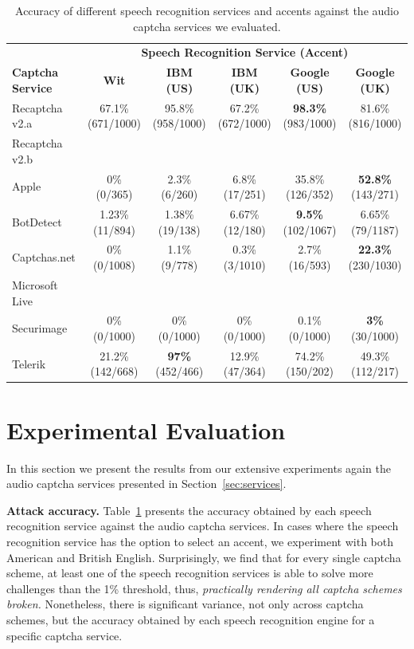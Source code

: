\begin{table}[t]
\centering
\caption{Accuracy of different speech recognition services and accents against the audio captcha services we evaluated.}
\begin{tabular}{lccccc}
\toprule
&\multicolumn{5}{c}{\textbf{Speech Recognition Service (Accent)}}\\
\cmidrule{2-6}
\textbf{Captcha Service}& \textbf{Wit}& \textbf{IBM (US)} & \textbf{ IBM (UK)} & \textbf{Google (US)} & \textbf{Google (UK)} \\
\hline
Recaptcha v2.a & 67.1\% (671/1000) & 95.8\% (958/1000) & 67.2\% (672/1000) & \textbf{98.3\%} (983/1000) & 81.6\% (816/1000) \\
\rowcolor{Gray}
Recaptcha v2.b &  &  &  &  & \\
Apple  & 0\% (0/365)  & 2.3\% (6/260) & 6.8\% (17/251) & 35.8\% (126/352) & \textbf{52.8\%} (143/271) \\
\rowcolor{Gray}
BotDetect  & 1.23\% (11/894)  & 1.38\% (19/138) & 6.67\% (12/180) & \textbf{9.5\%} (102/1067)  & 6.65\% (79/1187) \\
Captchas.net  & 0\% (0/1008) & 1.1\% (9/778)  & 0.3\% (3/1010)  & 2.7\% (16/593) & \textbf{22.3\%} (230/1030) \\
\rowcolor{Gray}
Microsoft Live & &  &  & & \\
Securimage  & 0\% (0/1000)  & 0\% (0/1000) & 0\% (0/1000) & 0.1\% (0/1000) & \textbf{3\%} (30/1000) \\
\rowcolor{Gray}
Telerik  & 21.2\% (142/668)  & \textbf{97\%} (452/466) & 12.9\% (47/364) & 74.2\% (150/202) & 49.3\% (112/217) \\
\bottomrule
\end{tabular}
\label{tab:combinations}
\end{table}

\section{Experimental Evaluation}
\label{sec:evaluation}

In this section we present the results from our extensive experiments again 
the audio captcha services presented in Section~\ref{sec:services}.

\textbf{Attack accuracy.} Table~\ref{tab:combinations} presents the accuracy obtained by each speech recognition service 
against the audio captcha services. In cases where the speech recognition service has the option to select an accent,
we experiment with both American and British English. Surprisingly, we find that for every single captcha scheme, at least
one of the speech recognition services is able to solve more challenges than the 1\% threshold, thus, \emph{practically 
rendering all captcha schemes broken.} Nonetheless, there is significant variance, not only across captcha schemes, but
the accuracy obtained by each speech recognition engine for a specific captcha service. 

